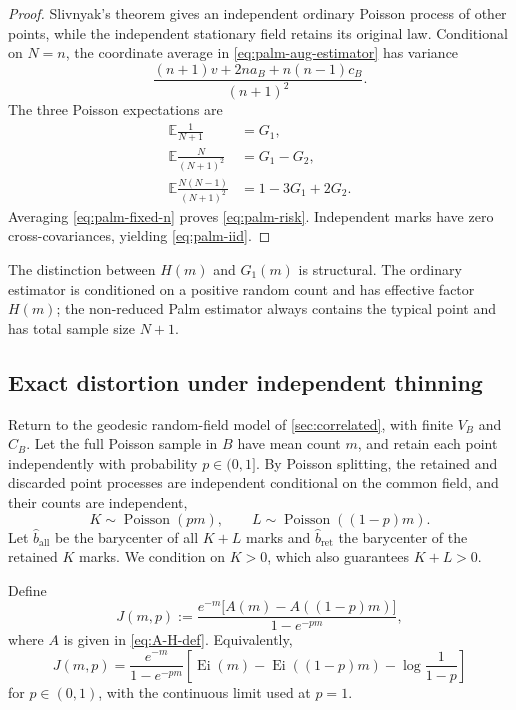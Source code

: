 \documentclass[11pt,a4paper]{article}
\theoremstyle{remark}
\newcommand{\EE}{\mathbb E}
\begin{document}
\begin{proof}
Slivnyak's theorem gives an independent ordinary Poisson process of other points, while the independent stationary field retains its original law.  Conditional on \(N=n\), the coordinate average in \eqref{eq:palm-aug-estimator} has variance
\begin{equation}
\label{eq:palm-fixed-n}
 \frac{(n+1)v+2na_B+n(n-1)c_B}{(n+1)^2}.
\end{equation}
The three Poisson expectations are
\begin{align*}
 \EE\frac1{N+1}&=G_1,\\
 \EE\frac{N}{(N+1)^2}&=G_1-G_2,\\
 \EE\frac{N(N-1)}{(N+1)^2}&=1-3G_1+2G_2.
\end{align*}
Averaging \eqref{eq:palm-fixed-n} proves \eqref{eq:palm-risk}.  Independent marks have zero cross-covariances, yielding \eqref{eq:palm-iid}.
\end{proof}

The distinction between \(H(m)\) and \(G_1(m)\) is structural.  The ordinary estimator is conditioned on a positive random count and has effective factor \(H(m)\); the non-reduced Palm estimator always contains the typical point and has total sample size \(N+1\).

\subsection{Exact distortion under independent thinning}

Return to the geodesic random-field model of \cref{sec:correlated}, with finite \(V_B\) and \(C_B\).  Let the full Poisson sample in \(B\) have mean count \(m\), and retain each point independently with probability \(p\in(0,1]\).  By Poisson splitting, the retained and discarded point processes are independent conditional on the common field, and their counts are independent,
\begin{equation}
\label{eq:split-counts}
 K\sim\operatorname{Poisson}(pm),
 \qquad
 L\sim\operatorname{Poisson}((1-p)m).
\end{equation}
Let \(\widehat b_{\mathrm{all}}\) be the barycenter of all \(K+L\) marks and \(\widehat b_{\mathrm{ret}}\) the barycenter of the retained \(K\) marks.  We condition on \(K>0\), which also guarantees \(K+L>0\).

Define
\begin{equation}
\label{eq:J-def}
 J(m,p):=
 \frac{e^{-m}\bigl[A(m)-A((1-p)m)\bigr]}{1-e^{-pm}},
\end{equation}
where \(A\) is given in \eqref{eq:A-H-def}.  Equivalently,
\begin{equation}
\label{eq:J-Ei}
 J(m,p)=\frac{e^{-m}}{1-e^{-pm}}
 \left[
 \operatorname{Ei}(m)-\operatorname{Ei}((1-p)m)
 -\log\frac1{1-p}
 \right]
\end{equation}
for \(p\in(0,1)\), with the continuous limit used at \(p=1\).
\end{document}
